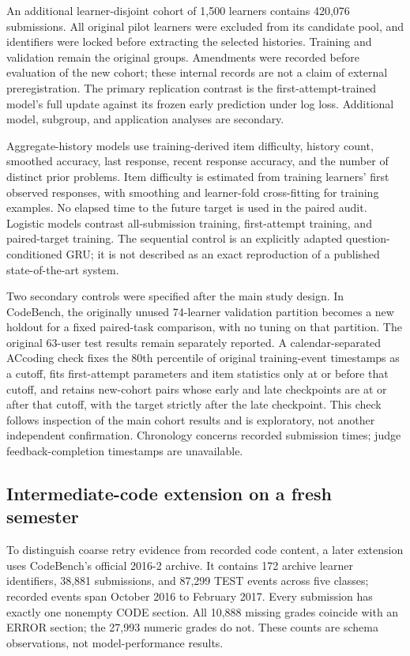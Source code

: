 \documentclass[11pt]{article}
\newcommand{\1}{\mathbb{I}}
\begin{document}
An additional learner-disjoint cohort of 1,500 learners contains 420,076 submissions. All original pilot learners were excluded from its candidate pool, and identifiers were locked before extracting the selected histories. Training and validation remain the original groups. Amendments were recorded before evaluation of the new cohort; these internal records are not a claim of external preregistration. The primary replication contrast is the first-attempt-trained model's full update against its frozen early prediction under log loss. Additional model, subgroup, and application analyses are secondary.

Aggregate-history models use training-derived item difficulty, history count, smoothed accuracy, last response, recent response accuracy, and the number of distinct prior problems. Item difficulty is estimated from training learners' first observed responses, with smoothing and learner-fold cross-fitting for training examples. No elapsed time to the future target is used in the paired audit. Logistic models contrast all-submission training, first-attempt training, and paired-target training. The sequential control is an explicitly adapted question-conditioned GRU; it is not described as an exact reproduction of a published state-of-the-art system.

Two secondary controls were specified after the main study design. In CodeBench, the originally unused 74-learner validation partition becomes a new holdout for a fixed paired-task comparison, with no tuning on that partition. The original 63-user test results remain separately reported. A calendar-separated ACcoding check fixes the 80th percentile of original training-event timestamps as a cutoff, fits first-attempt parameters and item statistics only at or before that cutoff, and retains new-cohort pairs whose early and late checkpoints are at or after that cutoff, with the target strictly after the late checkpoint. This check follows inspection of the main cohort results and is exploratory, not another independent confirmation. Chronology concerns recorded submission times; judge feedback-completion timestamps are unavailable.

\subsection{Intermediate-code extension on a fresh semester}
To distinguish coarse retry evidence from recorded code content, a later extension uses CodeBench's official 2016-2 archive. It contains 172 archive learner identifiers, 38,881 submissions, and 87,299 TEST events across five classes; recorded events span October 2016 to February 2017. Every submission has exactly one nonempty CODE section. All 10,888 missing grades coincide with an ERROR section; the 27,993 numeric grades do not. These counts are schema observations, not model-performance results.
\end{document}
